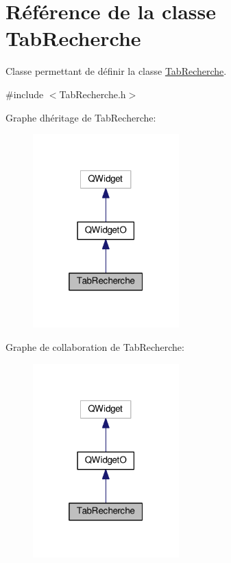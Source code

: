 \hypertarget{class_tab_recherche}{}\section{Référence de la classe Tab\+Recherche}
\label{class_tab_recherche}


Classe permettant de définir la classe \hyperlink{class_tab_recherche}{Tab\+Recherche}.  




{\ttfamily \#include $<$Tab\+Recherche.\+h$>$}



Graphe d\textquotesingle{}héritage de Tab\+Recherche\+:\nopagebreak
\begin{figure}[H]
\begin{center}
\leavevmode
\includegraphics[width=160pt]{class_tab_recherche__inherit__graph}
\end{center}
\end{figure}


Graphe de collaboration de Tab\+Recherche\+:\nopagebreak
\begin{figure}[H]
\begin{center}
\leavevmode
\includegraphics[width=160pt]{class_tab_recherche__coll__graph}
\end{center}
\end{figure}

